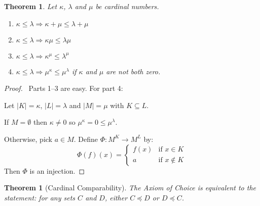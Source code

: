 \documentclass{report}
\let\qed\relax
\newtheorem{theorem}[axiom]{Theorem}
\theoremstyle{definition}
\begin{document}
    \begin{theorem}
        Let $\kappa$, $\lambda$ and $\mu$ be cardinal numbers.
        \begin{enumerate}
            \item $\kappa \leq \lambda \Rightarrow \kappa + \mu \leq \lambda + \mu$
            \item $\kappa \leq \lambda \Rightarrow \kappa \mu \leq \lambda \mu$
            \item $\kappa \leq \lambda \Rightarrow \kappa^\mu \leq \lambda^\mu$
            \item $\kappa \leq \lambda \Rightarrow \mu^\kappa \leq \mu^\lambda$ if $\kappa$ and $\mu$
            are not both zero.
        \end{enumerate}
    \end{theorem}

    \begin{proof}
        \pf\ Parts 1--3 are easy. For part 4:
        
        Let $|K| = \kappa$, $|L| = \lambda$ and $|M| = \mu$ with $K \subseteq L$.

        If $M = \emptyset$ then $\kappa \neq 0$ so $\mu^\kappa = 0 \leq \mu^\lambda$.

        Otherwise, pick $a \in M$. Define $\Phi : M^K \rightarrow M^L$ by:
        \[ \Phi(f)(x) = \begin{cases}
            f(x) & \text{if } x \in K \\
            a & \text{if } x \notin K
        \end{cases} \]
        Then $\Phi$ is an injection. \qed
    \end{proof}

    \begin{theorem}[Cardinal Comparability]
        The Axiom of Choice is equivalent to the statement: for any sets $C$ and $D$,
        either $C \preccurlyeq D$ or $D \preccurlyeq C$.
    \end{theorem}
\end{document}
